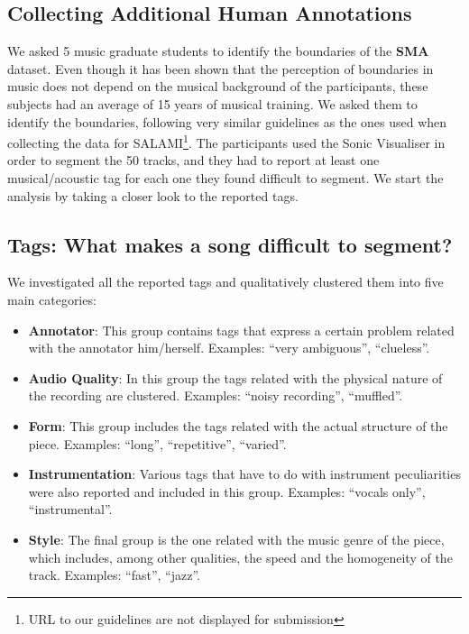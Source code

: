 \documentclass{article}
\begin{document}
\subsection{Collecting Additional Human Annotations}

We asked 5 music graduate students to identify the boundaries of the \textbf{SMA} dataset.
Even though it has been shown that the perception of boundaries in music does not depend on the musical background of the participants\cite{Bruderer2009}, these subjects had an average of 15 years of musical training.
We asked them to identify the boundaries, following very similar guidelines as the ones used when collecting the data for SALAMI\cite{Smith2011}\footnote{URL to our guidelines are not displayed for submission}.
The participants used the Sonic Visualiser\cite{Cannam2006} in order to segment the 50 tracks, and they had to report at least one musical/acoustic tag for each one they found difficult to segment.
We start the analysis by taking a closer look to the reported tags.

\subsection{Tags: What makes a song difficult to segment?}

We investigated all the reported tags and qualitatively clustered them into five main categories:

\begin{itemize}
  \item
    \textbf{Annotator}: This group contains tags that express a certain problem related with the annotator him/herself. 
    Examples: ``very ambiguous'', ``clueless''.

  \item
    \textbf{Audio Quality}: In this group the tags related with the physical nature of the recording are clustered. 
    Examples: ``noisy recording'', ``muffled''.

  \item
    \textbf{Form}: This group includes the tags related with the actual structure of the piece. Examples: ``long'', ``repetitive'', ``varied''.

  \item
    \textbf{Instrumentation}: Various tags that have to do with instrument peculiarities were also reported and included in this group. Examples: ``vocals only'', ``instrumental''.

  \item
    \textbf{Style}: The final group is the one related with the music genre of the piece, which includes, among other qualities, the speed and the homogeneity of the track. Examples: ``fast'', ``jazz''.
\end{itemize}
\end{document}
